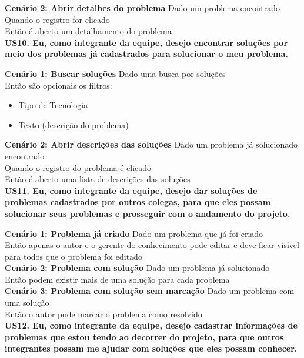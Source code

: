 \textbf{Cenário 2: Abrir detalhes do problema}
Dado um problema encontrado\\
Quando o registro for clicado\\
Então é aberto um detalhamento do problema\\

\textbf{US10. Eu, como integrante da equipe, desejo encontrar soluções por meio dos problemas já cadastrados para solucionar o meu problema.}

\textbf{Cenário 1: Buscar soluções}
Dado uma busca por soluções\\
Então são opcionais os filtros:
\begin{itemize}
\item Tipo de Tecnologia
\item Texto (descrição do problema)
\end{itemize} 

\textbf{Cenário 2: Abrir descrições das soluções}
Dado um problema já solucionado encontrado\\
Quando o registro do problema é clicado\\
Então é aberto uma lista de descrições das soluções\\

\textbf{US11. Eu, como integrante da equipe, desejo dar soluções de problemas cadastrados por outros colegas, para que eles possam solucionar seus problemas e prosseguir com o andamento do projeto.}

\textbf{Cenário 1: Problema já criado}
Dado um problema que já foi criado\\
Então apenas o autor e o gerente do conhecimento pode editar e deve ficar visível para todos que o problema foi editado\\

\textbf{Cenário 2: Problema com solução}
Dado um problema já solucionado\\
Então podem existir mais de uma solução para cada problema\\

\textbf{Cenário 3: Problema com solução sem marcação}
Dado um problema com uma solução\\
Então o autor pode marcar o problema como resolvido\\

\textbf{US12. Eu, como integrante da equipe, desejo cadastrar informações de problemas que estou tendo ao decorrer do projeto, para que outros integrantes possam me ajudar com soluções que eles possam conhecer.}

